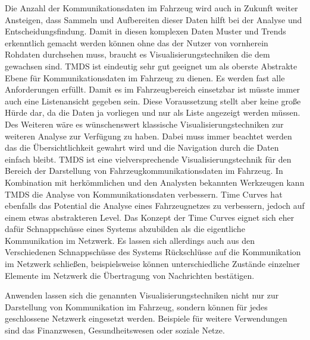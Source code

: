 \documentclass[draft=false
              ,paper=a4
              ,twoside=false
              ,fontsize=11pt
              ,headsepline
              ,BCOR10mm
              ,DIV11
              ]{scrbook}
\newcommand{\TODO}[1]{\colorbox{yellow}{\textcolor{red}{[TODO: #1]}}}
\begin{document}
Die Anzahl der Kommunikationsdaten im Fahrzeug wird auch in Zukunft weiter Ansteigen, dass Sammeln und Aufbereiten dieser Daten hilft bei der Analyse und Entscheidungsfindung. Damit in diesen komplexen Daten Muster und Trends erkenntlich gemacht werden können ohne das der Nutzer von vornherein Rohdaten durchsehen muss, braucht es Visualisierungstechniken die dem gewachsen sind. TMDS ist eindeutig sehr gut geeignet um als oberste Abstrakte Ebene für Kommunikationsdaten im Fahrzeug zu dienen. Es werden fast alle Anforderungen erfüllt. Damit es im Fahrzeugbereich einsetzbar ist müsste immer auch eine Listenansicht gegeben sein. Diese Voraussetzung stellt aber keine große Hürde dar, da die Daten ja vorliegen und nur als Liste angezeigt werden müssen. Des Weiteren wäre es wünschenswert klassische Visualisierungstechniken zur weiteren Analyse zur Verfügung zu haben. Dabei muss immer beachtet werden das die Übersichtlichkeit gewahrt wird und die Navigation durch die Daten einfach bleibt. TMDS ist eine vielversprechende Visualisierungstechnik für den Bereich der Darstellung von Fahrzeugkommunikationsdaten im Fahrzeug. In Kombination mit herkömmlichen und den Analysten bekannten Werkzeugen kann TMDS die Analyse von Kommunikationsdaten verbessern. Time Curves hat ebenfalls das Potential die Analyse eines Fahrzeugnetzes zu verbessern, jedoch auf einem etwas abstrakteren Level. Das Konzept der Time Curves eignet sich eher dafür Schnappschüsse eines Systems abzubilden als die eigentliche Kommunikation im Netzwerk. Es lassen sich allerdings auch aus den Verschiedenen Schnappschüsse des Systems Rückschlüsse auf die Kommunikation im Netzwerk schließen, beispielsweise können unterschiedliche Zustände einzelner Elemente im Netzwerk die Übertragung von Nachrichten bestätigen.

Anwenden lassen sich die genannten Visualisierungstechniken nicht nur zur Darstellung von Kommunikation im Fahrzeug, sondern können für jedes geschlossene Netzwerk eingesetzt werden. Beispiele für weitere Verwendungen sind das Finanzwesen, Gesundheitswesen oder soziale Netze.

\end{document}
